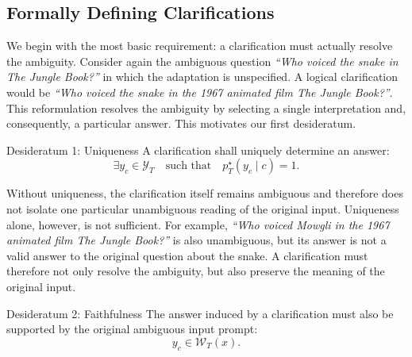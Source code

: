 


\subsection{Formally Defining Clarifications} 
\label{sec:4.1}
We begin with the most basic requirement: a clarification must actually resolve the ambiguity. Consider again the ambiguous question \emph{``Who voiced the snake in The Jungle Book?''} in which the adaptation is unspecified. A logical clarification would be \emph{``Who voiced the snake in the 1967 animated film \textit{The Jungle Book}?''}. This reformulation resolves the ambiguity by selecting a single interpretation and, consequently, a particular answer. This motivates our first desideratum.

\begin{desideratum}{Desideratum 1: Uniqueness} A clarification shall uniquely determine an answer: \[ \exists y_c \in \mathcal{Y}_T \quad \text{such that} \quad p_T^\star(y_c \mid c)=1. \] \end{desideratum} Without uniqueness, the clarification itself remains ambiguous and therefore does not isolate one particular unambiguous reading of the original input. Uniqueness alone, however, is not sufficient. For example, \emph{``Who voiced Mowgli in the 1967 animated film \textit{The Jungle Book}?''} is also unambiguous, but its answer is not a valid answer to the original question about the snake. A clarification must therefore not only resolve the ambiguity, but also preserve the meaning of the original input.




\begin{desideratum}{Desideratum 2: Faithfulness} The answer induced by a clarification must also be supported by the original ambiguous input prompt: \[ y_c \in \mathcal{W}_T(x). \] \end{desideratum} 

